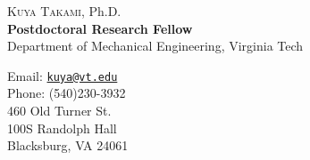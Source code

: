 \documentclass[11pt,letterpaper]{article}
\begin{document}
  \begin{minipage}{0.7\linewidth}
  {\vspace{1cm}\selectfont \Huge {\scshape Kuya Takami}, Ph.D.}\\
\vspace{5mm}
{\bf Postdoctoral Research Fellow}\\
Department of Mechanical Engineering, Virginia Tech\\

  \end{minipage}
  \hspace{2mm}
  \begin{minipage}{0.6\linewidth}
    \vspace{5mm}
  	Email:  \href{mailto:kuya@vt.edu}{\tt kuya@vt.edu} \\
    Phone:  (540)230-3932\\

    460 Old Turner St.\\
    100S Randolph Hall\\
    Blacksburg, VA 24061\\
  \end{minipage}
\end{document}
